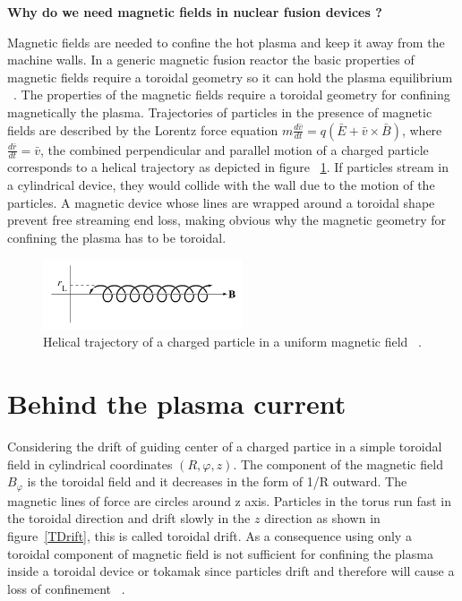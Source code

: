 \textbf{Why do we need magnetic fields in nuclear fusion devices ?}
\smallskip

Magnetic fields are needed to confine the hot plasma and keep it away from the machine walls.  In a generic magnetic fusion reactor the basic properties of magnetic fields require  a toroidal geometry so it can hold the plasma equilibrium ~\cite[Chapter~4]{Freidberg2007}. The properties of the magnetic fields require a toroidal geometry for confining magnetically the plasma. Trajectories of particles in the presence of magnetic fields are described by the Lorentz force equation $m \frac{d\bar{v}}{dt}=q(\bar{E}+\bar{v}\times \bar{B})$, where $\frac{d\bar{r}}{dt}=\bar{v}$, the combined perpendicular and parallel motion of a charged particle corresponds to a helical trajectory as  depicted in figure ~\ref{Helical}. If particles stream in a cylindrical device, they would collide with the wall due to the motion of the particles. A magnetic device whose lines are wrapped around  a toroidal shape  prevent free streaming end loss, making obvious why the magnetic geometry for confining the plasma has to be toroidal.\smallskip

\begin{figure}
	\centering
	\includegraphics[width=0.525\textwidth]{Chp1/Helical_tray.png}
	\caption{  Helical trajectory of a charged particle in a uniform magnetic field ~\cite[Chapter~8]{Freidberg2007}.\label{Helical}}
\end{figure}

\section{Behind the plasma current}

Considering the drift of guiding center of a charged partice in a simple toroidal field in cylindrical coordinates $(R,\varphi,z)$. The component of the magnetic field $B_\varphi$ is the toroidal field and it decreases in the form of 1/R outward. The magnetic lines of force are circles around z axis. Particles in the  torus run fast in the toroidal direction and drift slowly in the $z$ direction as shown in figure~\ref{TDrift}, this  is called toroidal drift. As a consequence  using only a toroidal component of magnetic field is not sufficient for confining the plasma inside a toroidal device or  tokamak  since particles drift and therefore will cause a loss of confinement ~\cite[Chapter~3]{Miyamoto2011}.\smallskip


